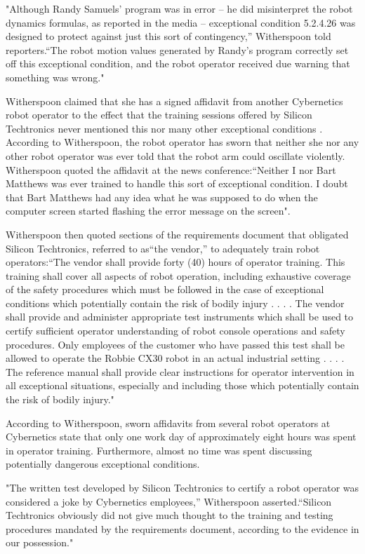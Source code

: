 "Although Randy Samuels' program was in error -- he did misinterpret the robot dynamics formulas, as reported in the media -- exceptional condition 5.2.4.26 was designed to protect against just this sort of contingency,'' Witherspoon told reporters.``The robot motion values generated by Randy's program correctly set off this exceptional condition, and the robot operator received due warning that something was wrong."

Witherspoon claimed that she has a signed affidavit from another Cybernetics robot operator to the effect that the training sessions offered by Silicon Techtronics never mentioned this nor many other exceptional conditions . According to Witherspoon, the robot operator has sworn that neither she nor any other robot operator was ever told that the robot arm could oscillate violently. Witherspoon quoted the affidavit at the news conference:``Neither I nor Bart Matthews was ever trained to handle this sort of exceptional condition. I doubt that Bart Matthews had any idea what he was supposed to do when the computer screen started flashing the error message on the screen".

Witherspoon then quoted sections of the requirements document that obligated Silicon Techtronics, referred to as``the vendor,'' to adequately train robot operators:``The vendor shall provide forty (40) hours of operator training. This training shall cover all aspects of robot operation, including exhaustive coverage of the safety procedures which must be followed in the case of exceptional conditions which potentially contain the risk of bodily injury . . . . The vendor shall provide and administer appropriate test instruments which shall be used to certify sufficient operator understanding of robot console operations and safety procedures. Only employees of the customer who have passed this test shall be allowed to operate the Robbie CX30 robot in an actual industrial setting . . . . The reference manual shall provide clear instructions for operator intervention in all exceptional situations, especially and including those which potentially contain the risk of bodily injury."

According to Witherspoon, sworn affidavits from several robot operators at Cybernetics state that only one work day of approximately eight hours was spent in operator training. Furthermore, almost no time was spent discussing potentially dangerous exceptional conditions.

"The written test developed by Silicon Techtronics to certify a robot operator was considered a joke by Cybernetics employees,'' Witherspoon asserted.``Silicon Techtronics obviously did not give much thought to the training and testing procedures mandated by the requirements document, according to the evidence in our possession."
